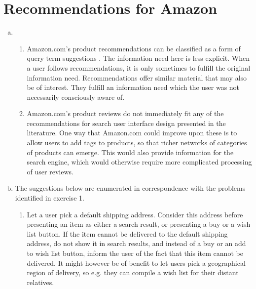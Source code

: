 
\section{Recommendations for Amazon}

\begin{enumerate}[a.]

\item

\begin{enumerate}[1.]

\item Amazon.com's product recommendations can be classified as a form of query
term suggestions \cite[\textsection\ 1.5.4]{hearst}. The information need here
is less explicit. When a user follows recommendations, it is only sometimes to
fulfill the original information need. Recommendations offer similar material
that may also be of interest. They fulfill an information need which the user
was not necessarily consciously aware of.

\item Amazon.com's product reviews do not immediately fit any of the
recommendations for search user interface design presented in the literature.
One way that Amazon.com could improve upon these is to allow users to add tags
to products, so that richer networks of categories of products can emerge. This
would also provide information for the search engine, which would otherwise
require more complicated processing of user reviews.

\end{enumerate}

\item

The suggestions below are enumerated in correspondence with the problems
identified in exercise 1.

\begin{enumerate}[1.]

\item Let a user pick a default shipping address. Consider this address before
presenting an item as either a search result, or presenting a buy or a wish
list button. If the item cannot be delivered to the default shipping address,
do not show it in search results, and instead of a buy or an add to wish list
button, inform the user of the fact that this item cannot be delivered. It
might however be of benefit to let users pick a geographical region of
delivery, so e.g. they can compile a wish list for their distant relatives.


\end{enumerate}
\end{enumerate}

